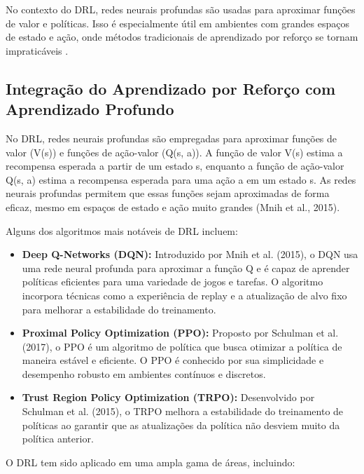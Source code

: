 No contexto do DRL, redes neurais profundas são usadas para aproximar funções de valor e políticas. Isso é especialmente útil em ambientes com grandes espaços de estado e ação, onde métodos tradicionais de aprendizado por reforço se tornam impraticáveis \cite{goodfellow2016deep}.

\subsection{Integração do Aprendizado por Reforço com Aprendizado Profundo}

No DRL, redes neurais profundas são empregadas para aproximar funções de valor (V(s)) e funções de ação-valor (Q(s, a)). A função de valor V(s) estima a recompensa esperada a partir de um estado s, enquanto a função de ação-valor Q(s, a) estima a recompensa esperada para uma ação a em um estado s. As redes neurais profundas permitem que essas funções sejam aproximadas de forma eficaz, mesmo em espaços de estado e ação muito grandes (Mnih et al., 2015).

Alguns dos algoritmos mais notáveis de DRL incluem:

\begin{itemize}
    \item \textbf{Deep Q-Networks (DQN):} Introduzido por Mnih et al. (2015), o DQN usa uma rede neural profunda para aproximar a função Q e é capaz de aprender políticas eficientes para uma variedade de jogos e tarefas. O algoritmo incorpora técnicas como a experiência de replay e a atualização de alvo fixo para melhorar a estabilidade do treinamento.
    
    \item \textbf{Proximal Policy Optimization (PPO):} Proposto por Schulman et al. (2017), o PPO é um algoritmo de política que busca otimizar a política de maneira estável e eficiente. O PPO é conhecido por sua simplicidade e desempenho robusto em ambientes contínuos e discretos.
    
    \item \textbf{Trust Region Policy Optimization (TRPO):} Desenvolvido por Schulman et al. (2015), o TRPO melhora a estabilidade do treinamento de políticas ao garantir que as atualizações da política não desviem muito da política anterior.
\end{itemize}

O DRL tem sido aplicado em uma ampla gama de áreas, incluindo:

